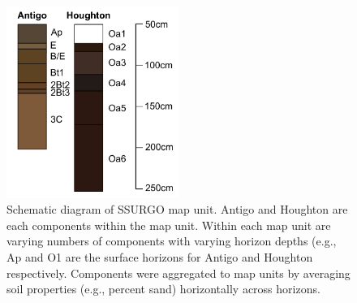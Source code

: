 \begin{figure}[h]
  \centering
    \includegraphics[width=0.5\textwidth]{./img/component_schematic.pdf}
	\caption[Schematic diagram of SSURGO map unit]{Schematic diagram of SSURGO map unit. Antigo and Houghton are each components within the map unit. Within each map unit are varying numbers of components with varying horizon depths (e.g., Ap and O1 are the surface horizons for Antigo and Houghton respectively. Components were aggregated to map units by averaging soil properties (e.g., percent sand) horizontally across horizons.}
	\label{fig:component_schematic}
\end{figure}
\clearpage
